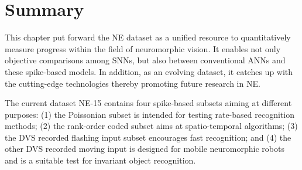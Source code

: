 %
%
%
%
%

\section{Summary}
\label{sec:summ}
This chapter put forward the NE dataset as a unified resource to quantitatively measure progress within the field of neuromorphic vision.
It enables not only objective comparisons among SNNs, but also between conventional ANNs and these spike-based models.
In addition, as an evolving dataset, it catches up with the cutting-edge technologies thereby promoting future research in NE.

The current dataset NE-15 contains four spike-based subsets aiming at different purposes: (1) the Poissonian subset is intended for testing rate-based recognition methods;
(2) the rank-order coded subset aims at spatio-temporal algorithms;
(3) the DVS recorded flashing input subset encourages fast recognition;
and (4) the other DVS recorded moving input is designed for mobile neuromorphic robots and is a suitable test for invariant object recognition.

